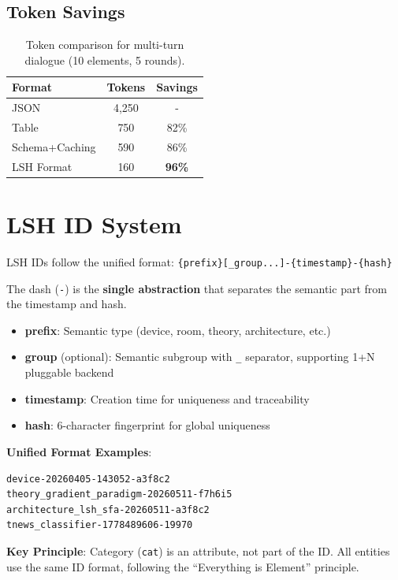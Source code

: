 \documentclass{article}
\begin{document}
\subsection{Token Savings}

\begin{table}[h]
\centering
\caption{Token comparison for multi-turn dialogue (10 elements, 5 rounds).}
\label{tab:token}
\begin{tabular}{lcc}
\toprule
\textbf{Format} & \textbf{Tokens} & \textbf{Savings} \\
\midrule
JSON & 4,250 & - \\
Table & 750 & 82\% \\
Schema+Caching & 590 & 86\% \\
LSH Format & 160 & \textbf{96\%} \\
\bottomrule
\end{tabular}
\end{table}

\section{LSH ID System}

LSH IDs follow the unified format: \texttt{\{prefix\}[\_group...]-\{timestamp\}-\{hash\}}

The dash (\texttt{-}) is the \textbf{single abstraction} that separates the semantic part from the timestamp and hash.

\begin{itemize}
\item \textbf{prefix}: Semantic type (device, room, theory, architecture, etc.)
\item \textbf{group} (optional): Semantic subgroup with \texttt{\_} separator, supporting 1+N pluggable backend
\item \textbf{timestamp}: Creation time for uniqueness and traceability
\item \textbf{hash}: 6-character fingerprint for global uniqueness
\end{itemize}

\textbf{Unified Format Examples}:

\begin{verbatim}
device-20260405-143052-a3f8c2
theory_gradient_paradigm-20260511-f7h6i5
architecture_lsh_sfa-20260511-a3f8c2
tnews_classifier-1778489606-19970
\end{verbatim}

\textbf{Key Principle}: Category (\texttt{cat}) is an attribute, not part of the ID. All entities use the same ID format, following the ``Everything is Element'' principle.
\end{document}
